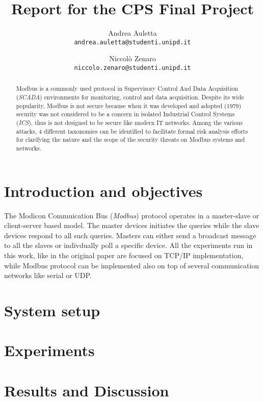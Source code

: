 \documentclass[12pt]{article}
\title{Report for the CPS Final Project}
\author{
    Andrea Auletta \\ \texttt{andrea.auletta@studenti.unipd.it} \and
    Niccolò Zenaro \\ \texttt{niccolo.zenaro@studenti.unipd.it}
}
\begin{document}
\maketitle
\newpage
\tableofcontents
\newpage

\begin{abstract}
Modbus is a commonly used protocol in Supervisory Control And Data Acquisition (\textit{SCADA}) environments
for monitoring, control and data acquisition. Despite its wide popularity, Modbus is not secure because when it was developed and adopted ($1979$) security was not considered to be a concern in isolated Industrial Control Systems (\textit{ICS}), thus is not designed to be secure like modern IT networks.
Among the various attacks, 4 different taxonomies can be identified to facilitate formal risk analysis efforts for clarifying the nature and the scope of the security threats on Modbus systems and networks.
\end{abstract}

\section{Introduction and objectives}
The Modicon Commuication Bus (\textit{Modbus}) protocol operates in a master-slave or client-server based model. The master devices initiates the queries while the slave devices respond to all such queries.
Masters can either send a broadcast message to all the slaves or indivdually poll a specific device. 
All the experiments run in this work, like in the original paper \cite{huitsing2008attack} are focused on TCP/IP implementation, while Modbus protocol can be implemented also on top of several communication networks like serial or UDP. 

\section{System setup}
\section{Experiments}
\section{Results and Discussion}
\printbibliography 
\end{document}
